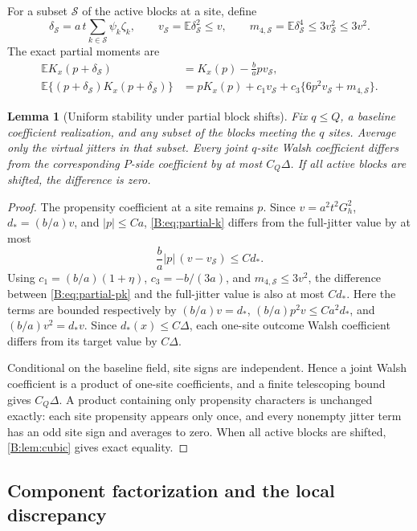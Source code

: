 \documentclass[11pt]{article}
\newtheorem{lemma}[lemma]{Lemma}
\newcommand{\E}{\mathbb{E}}
\newcommand{\cS}{\mathcal{S}}
\newcommand{\abs}[1]{\lvert #1\rvert}
\begin{document}
For a subset \(\cS\) of the active blocks at a site, define
\[
 \delta_{\cS}
 =a\,t\sum_{k\in\cS}\psi_k\zeta_k,
 \qquad
 v_{\cS}=\E\delta_{\cS}^2\le v,
 \qquad
 m_{4,\cS}=\E\delta_{\cS}^4\le3v_{\cS}^2\le3v^2.
\]
The exact partial moments are
\begin{align}
 \E K_x(p+\delta_{\cS})
 &=K_x(p)-\frac ba p v_{\cS},
 \label{B:eq:partial-k}\\
 \E\{(p+\delta_{\cS})K_x(p+\delta_{\cS})\}
 &=pK_x(p)+c_1v_{\cS}
   +c_3\{6p^2v_{\cS}+m_{4,\cS}\}.
 \label{B:eq:partial-pk}
\end{align}

\begin{lemma}[Uniform stability under partial block shifts]
\label{B:lem:partial-stability}
Fix \(q\le Q\), a baseline coefficient realization, and any subset of the
blocks meeting the \(q\) sites.  Average only the virtual jitters in that
subset.  Every joint \(q\)-site Walsh coefficient differs from the
corresponding \(P\)-side coefficient by at most \(C_Q\Delta\).  If all
active blocks are shifted, the difference is zero.
\end{lemma}

\begin{proof}
The propensity coefficient at a site remains \(p\).  Since
\(v=a^2t^2G_h^2\), \(d_*=(b/a)v\), and \(\abs p\le Ca\),
\eqref{B:eq:partial-k} differs from the full-jitter value by at most
\[
 \frac ba\abs p\,(v-v_{\cS})\le C d_*.
\]
Using \(c_1=(b/a)(1+\eta)\), \(c_3=-b/(3a)\), and
\(m_{4,\cS}\le3v^2\), the difference between
\eqref{B:eq:partial-pk} and the full-jitter value is also at most \(Cd_*\).
Here the terms are bounded respectively by
\((b/a)v=d_*\), \((b/a)p^2v\le Ca^2d_*\), and
\((b/a)v^2=d_*v\).  Since \(d_*(x)\le C\Delta\), each one-site outcome
Walsh coefficient differs from its target value by \(C\Delta\).

Conditional on the baseline field, site signs are independent.  Hence a
joint Walsh coefficient is a product of one-site coefficients, and a
finite telescoping bound gives \(C_Q\Delta\).  A product containing only
propensity characters is unchanged exactly: each site propensity appears
only once, and every nonempty jitter term has an odd site sign and averages
to zero.  When all active blocks are shifted,
\cref{B:lem:cubic} gives exact equality.
\end{proof}

\subsection{Component factorization and the local discrepancy}
\end{document}
